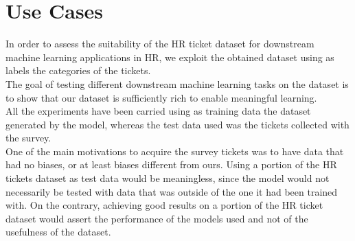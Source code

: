 \chapter{Use Cases}
\label{sec:Use_Cases}

In order to assess the suitability of the HR ticket dataset for downstream machine learning applications in HR, we exploit the obtained dataset using as labels the categories of the tickets. \\
The goal of testing different downstream machine learning tasks on the dataset is to show that our dataset is sufficiently rich to enable meaningful learning. \\
All the experiments have been carried using as training data the dataset generated by the model, whereas the test data used was the tickets collected with the survey. \\ 
One of the main motivations to acquire the survey tickets was to have data that had no biases, or at least biases different from ours. Using a portion of the HR tickets dataset as test data would be meaningless, since the model would not necessarily be tested with data that was outside of the one it had been trained with. On the contrary, achieving good results on a portion of the HR ticket dataset would assert the performance of the models used and not of the usefulness of the dataset.



